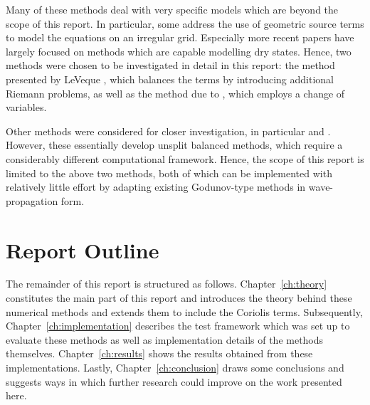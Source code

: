 Many of these methods deal with very specific models which are beyond the scope of this report. In particular, some address the use of geometric source terms to model the equations on an irregular grid. Especially more recent papers have largely focused on methods which are capable modelling dry states. Hence, two methods were chosen to be investigated in detail in this report: the method presented by LeVeque \cite{leveque1998balancing}, which balances the terms by introducing additional Riemann problems, as well as the method due to \citet{rogers2003mathematical}, which employs a change of variables.

Other methods were considered for closer investigation, in particular \cite{hubbard2000flux} and \cite{chertockwell}. However, these essentially develop unsplit balanced methods, which require a considerably different computational framework. Hence, the scope of this report is limited to the above two methods, both of which can be implemented with relatively little effort by adapting existing Godunov-type methods in wave-propagation form.

\section{Report Outline}

The remainder of this report is structured as follows. Chapter~\ref{ch:theory} constitutes the main part of this report and introduces the theory behind these numerical methods and extends them to include the Coriolis terms. Subsequently, Chapter~\ref{ch:implementation} describes the test framework which was set up to evaluate these methods as well as implementation details of the methods themselves. Chapter~\ref{ch:results} shows the results obtained from these implementations. Lastly, Chapter~\ref{ch:conclusion} draws some conclusions and suggests ways in which further research could improve on the work presented here.